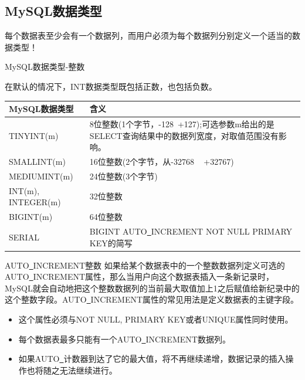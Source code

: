 \documentclass[CJK]{beamer}
\begin{document}
\begin{CJK*}{UTF8}{gbsn}
\subsection{MySQL数据类型}
\begin{frame}{}
	\begin{block}{}
		每个数据表至少会有一个数据列，而用户必须为每个数据列分别定义一个适当的数据类型！
	\end{block}
\end{frame}
\begin{frame}{MySQL数据类型-整数}
\begin{block}{}
{\tiny
在默认的情况下，INT数据类型既包括正数，也包括负数。
}
\end{block}
{\tiny
\begin{tabular}{l|p{8cm}}\hline
MySQL数据类型 &  含义 \\ \hline
TINYINT(m) & 8位整数(1个字节，-128~+127);可选参数m给出的是SELECT查询结果中的数据列宽度，对取值范围没有影响。\\ \hline
SMALLINT(m) & 16位整数(2个字节，从-32768 ~ +32767)\\ \hline
MEDIUMINT(m) & 24位整数(3个字节)\\ \hline
INT(m), INTEGER(m) & 32位整数\\ \hline
BIGINT(m) & 64位整数\\ \hline
SERIAL & BIGINT AUTO\underline{\ }INCREMENT NOT NULL PRIMARY KEY的简写\\ \hline
\end{tabular}
}
{\tiny
\begin{block}{AUTO\underline{\ }INCREMENT整数}
如果给某个数据表中的一个整数数据列定义可选的AUTO\underline{\ }INCREMENT属性，那么当用户向这个数据表插入一条新记录时，MySQL就会自动地把这个整数数据列的当前最大取值加上1之后赋值给新纪录中的这个整数字段。AUTO\underline{\ }INCREMENT属性的常见用法是定义数据表的主键字段。
	\begin{itemize}
		\item 这个属性必须与NOT NULL, PRIMARY KEY或者UNIQUE属性同时使用。
		\item 每个数据表最多只能有一个AUTO\underline{\ }INCREMENT数据列。
		\item 如果AUTO\underline{\ }计数器到达了它的最大值，将不再继续递增，数据记录的插入操作也将随之无法继续进行。
	\end{itemize}
\end{block}
}
\end{frame}


\end{CJK*}
\end{document}
